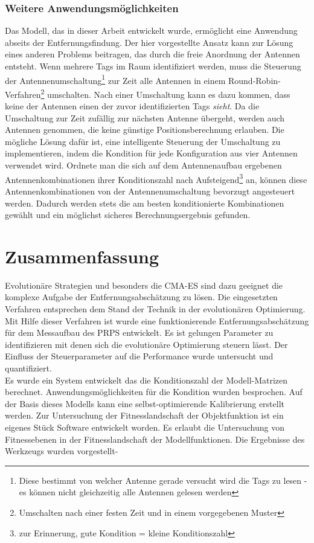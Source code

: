 \subsubsection{Weitere Anwendungsmöglichkeiten}
%
Das Modell, das in dieser Arbeit entwickelt wurde, ermöglicht eine Anwendung abseits der Entfernungsfindung. Der hier vorgestellte Ansatz kann zur Lösung eines anderen Problems beitragen, das durch die freie Anordnung der Antennen entsteht. Wenn mehrere Tags im Raum identifiziert werden, muss die Steuerung der Antennenumschaltung\footnote{Diese bestimmt von welcher Antenne gerade versucht wird die Tags zu lesen - es können nicht gleichzeitig alle Antennen gelesen werden} zur Zeit alle Antennen in einem Round-Robin-Verfahren\footnote{Umschalten nach einer festen Zeit und in einem vorgegebenen Muster} umschalten. Nach einer Umschaltung kann es dazu kommen, dass keine der Antennen einen der zuvor identifizierten Tags \textit{sieht}. Da die Umschaltung zur Zeit zufällig zur nächsten Antenne übergeht, werden auch Antennen genommen, die keine günstige Positionsberechnung erlauben. Die mögliche Lösung dafür ist, eine intelligente Steuerung der Umschaltung zu implementieren, indem die Kondition für jede Konfiguration aus vier Antennen verwendet wird. Ordnete man die sich auf dem Antennenaufbau ergebenen Antennenkombinationen ihrer Konditionszahl nach Aufsteigend\footnote{zur Erinnerung, gute Kondition = kleine Konditionszahl} an, können diese Antennenkombinationen von der Antennenumschaltung bevorzugt angesteuert werden. Dadurch werden stets die am besten konditionierte Kombinationen gewählt und ein möglichst sicheres Berechnungsergebnis gefunden.
%

\section{Zusammenfassung}
%
Evolutionäre Strategien und besonders die CMA-ES sind dazu geeignet die komplexe Aufgabe der Entfernungsabschätzung zu lösen. Die eingesetzten Verfahren entsprechen dem Stand der Technik in der evolutionären Optimierung. Mit Hilfe dieser Verfahren ist wurde eine funktionierende Entfernungsabschätzung für dem Messaufbau des PRPS entwickelt. Es ist gelungen Parameter zu identifizieren mit denen sich die evolutionäre Optimierung steuern lässt. Der Einfluss der Steuerparameter auf die Performance wurde untersucht und quantifiziert.\\

Es wurde ein System entwickelt das die Konditionszahl der Modell-Matrizen berechnet. Anwendungsmöglichkeiten für die Kondition wurden besprochen. Auf der Basis dieses Modells kann eine selbst-optimierende Kalibrierung erstellt werden. Zur Untersuchung der Fitnesslandschaft der Objektfunktion ist ein eigenes Stück Software entwickelt worden. Es erlaubt die Untersuchung von Fitnessebenen in der Fitnesslandschaft der Modellfunktionen. Die Ergebnisse des Werkzeugs wurden vorgestellt- \\

